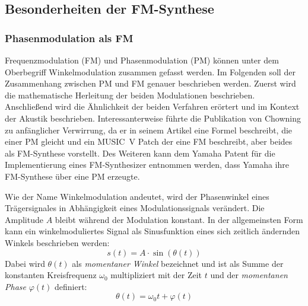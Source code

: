 \subsection{Besonderheiten der FM-Synthese}
\FloatBarrier
\subsubsection{Phasenmodulation als FM}
Frequenzmodulation (FM) und Phasenmodulation (PM) können unter dem Oberbegriff Winkelmodulation zusammen gefasst werden. Im Folgenden soll der Zusammenhang zwischen PM und FM genauer beschrieben werden. Zuerst wird die mathematische Herleitung der beiden Modulationen beschrieben. Anschließend wird die Ähnlichkeit der beiden Verfahren erörtert und im Kontext der Akustik beschrieben. Interessanterweise führte die Publikation von Chowning zu anfänglicher Verwirrung, da er in seinem Artikel eine Formel beschreibt, die einer PM gleicht und ein MUSIC~V Patch der eine FM beschreibt, aber beides als FM-Synthese vorstellt. \cite{rossum1999method} Des Weiteren kann dem Yamaha Patent für die Implementierung eines FM-Synthesizer entnommen werden, dass Yamaha ihre FM-Synthese über eine PM erzeugte. \cite{oya1987electronic} 

Wie der Name Winkelmodulation andeutet, wird der Phasenwinkel eines Trägersignales in Abhängigkeit eines Modulationssignals verändert. Die Amplitude \(A\) bleibt während der Modulation konstant. In der allgemeinsten Form kann ein winkelmoduliertes Signal als Sinusfunktion eines sich zeitlich ändernden Winkels beschrieben werden:
\begin{equation}
s(t)=A\cdot\sin(\theta(t))
\label{eq:signal_basis_funktion}
\end{equation}
Dabei wird \(\theta(t)\) als \textit{momentaner Winkel} bezeichnet und ist als Summe der konstanten Kreisfrequenz $\omega_0$ multipliziert mit der Zeit $t$ und der \textit{momentanen Phase} $\varphi(t)$ definiert:
\begin{equation*}
\theta(t)=\omega_0t + \varphi(t)
\end{equation*}

